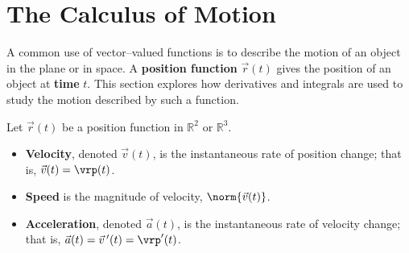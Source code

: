 \section{The Calculus of Motion}\label{sec:vvf_motion}

A common use of vector--valued functions is to describe the motion of an object in the plane or in space. A \textbf{position function} $\vec r(t)$ gives the position of an object at \textbf{time} $t$. This section explores how derivatives and integrals are used to study the motion described by such a function.

{Let $\vec r(t)$ be a position function in $\mathbb{R}^2$ or $\mathbb{R}^3$.
\begin{itemize}
	\item \textbf{Velocity}, denoted $\vec v(t)$, is the instantaneous rate of position change; that is, $\vec v(t) = \vrp(t)$.
	\item	\textbf{Speed} is the magnitude of velocity, $\norm{\vec v(t)}$.
	\item	\textbf{Acceleration}, denoted $\vec a(t)$, is the instantaneous rate of velocity change; that is, $\vec a(t) = \vec v\,'(t) = \vrp'(t)$.
\end{itemize}
}

